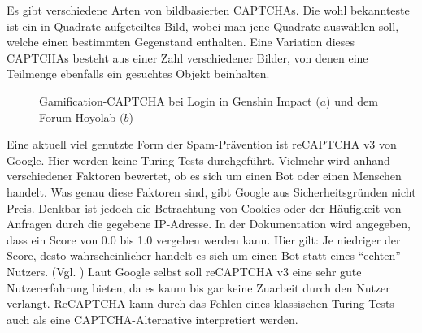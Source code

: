 Es gibt verschiedene Arten von bildbasierten CAPTCHAs. 
Die wohl bekannteste ist ein in Quadrate aufgeteiltes Bild, wobei man jene Quadrate auswählen soll, welche einen bestimmten Gegenstand enthalten.
Eine Variation dieses CAPTCHAs besteht aus einer Zahl verschiedener Bilder, von denen eine Teilmenge ebenfalls ein gesuchtes Objekt beinhalten.




\begin{figure}
    \centering
    \qquad
    \caption{Gamification-CAPTCHA bei Login in Genshin Impact $(a$) und dem Forum Hoyolab $(b$)}   
\end{figure}

Eine aktuell viel genutzte Form der Spam-Prävention ist reCAPTCHA v3 von Google. 
Hier werden keine Turing Tests durchgeführt. 
Vielmehr wird anhand verschiedener Faktoren bewertet, ob es sich um einen Bot oder einen Menschen handelt.
Was genau diese Faktoren sind, gibt Google aus Sicherheitsgründen nicht Preis. 
Denkbar ist jedoch die Betrachtung von Cookies oder der Häufigkeit von Anfragen durch die gegebene IP-Adresse.
In der Dokumentation wird angegeben, dass ein Score von 0.0 bis 1.0 vergeben werden kann. 
Hier gilt: Je niedriger der Score, desto wahrscheinlicher handelt es sich um einen Bot statt eines ``echten'' Nutzers. (Vgl. \cite{recaptchadoc})
Laut Google selbst soll reCAPTCHA v3 eine sehr gute Nutzererfahrung bieten, da es kaum bis gar keine Zuarbeit durch den Nutzer verlangt. \cite{googleblog:recaptcha}
ReCAPTCHA kann durch das Fehlen eines klassischen Turing Tests auch als eine CAPTCHA-Alternative interpretiert werden.

